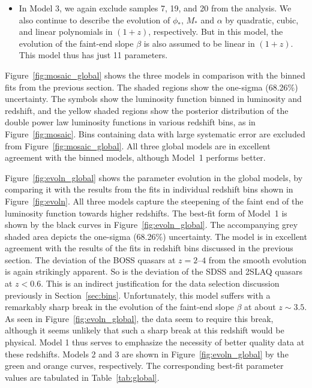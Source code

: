 \documentclass[fleqn,usenatbib]{mnras}
\begin{document}
\begin{itemize}
\item In Model 3, we again exclude samples 7, 19, and 20 from the
  analysis.  We also continue to describe the evolution of $\phi_*$,
  $M_*$ and $\alpha$ by quadratic, cubic, and linear polynomials in
  $(1+z)$, respectively.  But in this model, the evolution of the
  faint-end slope $\beta$ is also assumed to be linear in $(1+z)$.
  This model thus has just 11 parameters.
\end{itemize}

Figure~\ref{fig:mosaic_global} shows the three models in comparison
with the binned fits from the previous section.  The shaded regions
show the one-sigma (68.26\%) uncertainty.  The symbols show the
luminosity function binned in luminosity and redshift, and the yellow
shaded regions show the posterior distribution of the double power law
luminosity functions in various redshift bins, as in
Figure~\ref{fig:mosaic}.  Bins containing data with large systematic
error are excluded from Figure~\ref{fig:mosaic_global}.  All three
global models are in excellent agreement with the binned models,
although Model~1 performs better.  

Figure~\ref{fig:evoln_global} shows the parameter evolution in the
global models, by comparing it with the results from the fits in
individual redshift bins shown in Figure~\ref{fig:evoln}.  All three
models capture the steepening of the faint end of the luminosity
function towards higher redshifts.  The best-fit form of Model~1 is
shown by the black curves in Figure~\ref{fig:evoln_global}.  The
accompanying grey shaded area depicts the one-sigma (68.26\%)
uncertainty.  The model is in excellent agreement with the results of
the fits in redshift bins discussed in the previous section.  The
deviation of the BOSS quasars at $z=2$--$4$ from the smooth evolution
is again strikingly apparent.  So is the deviation of the SDSS and
2SLAQ quasars at $z<0.6$.  This is an indirect justification for the
data selection discussion previously in Section~\ref{sec:bins}.
Unfortunately, this model suffers with a remarkably sharp break in the
evolution of the faint-end slope $\beta$ at about $z\sim 3.5$.  As
seen in Figure~\ref{fig:evoln_global}, the data seem to require this
break, although it seems unlikely that such a sharp break at this
redshift would be physical.  Model 1 thus serves to emphasize the
necessity of better quality data at these redshifts.  Models 2 and 3
are shown in Figure~\ref{fig:evoln_global} by the green and orange
curves, respectively.  The corresponding best-fit parameter values are
tabulated in Table~\ref{tab:global}.
\end{document}
